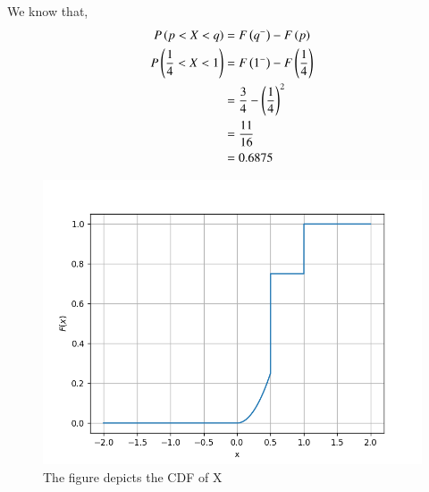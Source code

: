 
We know that,
\begin{align}
   P\left(p<X<q\right) &= F\left(q^{-}\right)-F\left(p\right) \\
    P\left(\frac{1}{4} < X < 1\right) &= F\left(1^{-}\right)-F\left(\frac{1}{4}\right) \\
    &= \frac{3}{4} - \left(\frac{1}{4}\right)^{2}\\
    &= \frac{11}{16}\\
    &= 0.6875
\end{align}
\begin{figure}[!ht]
\centering
\includegraphics[width=\columnwidth]{solutions/ec/73/Assignment2.png}
\caption{The figure depicts the CDF of X}
\label{ec73:cdf}
\end{figure}

